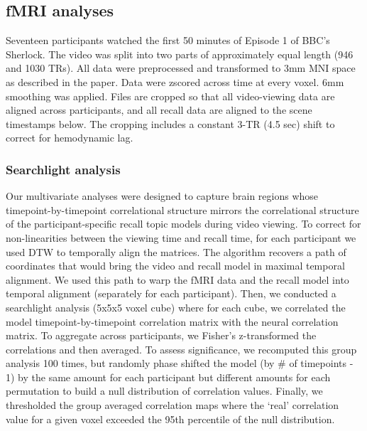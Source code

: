 \documentclass{article}
\begin{document}
{ \subsection{fMRI analyses}
 Seventeen participants watched the first 50 minutes of Episode 1 of BBC's Sherlock. The video was split into two parts of approximately equal length (946 and 1030 TRs). All data were preprocessed and transformed to 3mm MNI space as described in the paper. Data were zscored across time at every voxel. 6mm smoothing was applied.
 Files are cropped so that all video-viewing data are aligned across participants, and all recall data are aligned to the scene timestamps below. The cropping includes a constant 3-TR (4.5 sec) shift to correct for hemodynamic lag.

 \subsubsection{Searchlight analysis}
 Our multivariate analyses were designed to capture brain regions whose timepoint-by-timepoint correlational structure mirrors the correlational structure of the participant-specific recall topic models during video viewing. To correct for non-linearities between the viewing time and recall time, for each participant we used DTW to temporally align the matrices. The algorithm recovers a path of coordinates that would bring the video and recall model in maximal temporal alignment. We used this path to warp the fMRI data and the recall model into temporal alignment (separately for each participant). Then, we conducted a searchlight analysis (5x5x5 voxel cube) where for each cube, we correlated the model timepoint-by-timepoint correlation matrix with the neural correlation matrix. To aggregate across participants, we Fisher's z-transformed the correlations and then averaged.  To assess significance, we recomputed this group analysis 100 times, but randomly phase shifted the model (by \# of timepoints - 1) by the same amount for each participant but different amounts for each permutation to build a null distribution of correlation values. Finally, we thresholded the group averaged correlation maps where the `real' correlation value for a given voxel exceeded the 95th percentile of the null distribution.




}
\end{document}
